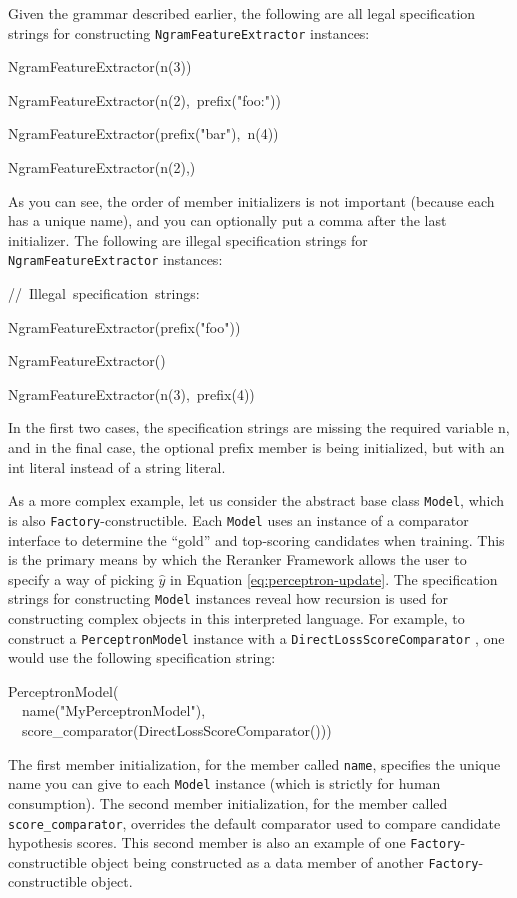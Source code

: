 \documentclass[a4paper]{article}
\let\textquotedbl="
\newenvironment{lyxcode}
{\par\begin{list}{}{
\scriptsize
\setlength{\leftmargin}{0.1in}
\setlength{\rightmargin}{\leftmargin}
\setlength{\listparindent}{0pt}%
\raggedright
\setlength{\itemsep}{0pt}
\setlength{\parsep}{0pt}
\normalfont\ttfamily}%
 \item[]}
{\end{list}}
\begin{document}
Given the grammar described earlier, the following are all legal specification
strings for constructing \texttt{NgramFeatureExtractor} instances:
\begin{lyxcode}
NgramFeatureExtractor(n(3))

NgramFeatureExtractor(n(2),~prefix(\textquotedbl{}foo:\textquotedbl{}))

NgramFeatureExtractor(prefix(\textquotedbl{}bar\textquotedbl{}),~n(4))

NgramFeatureExtractor(n(2),)
\end{lyxcode}
As you can see, the order of member initializers is not important
(because each has a unique name), and you can optionally put a comma
after the last initializer. The following are illegal specification
strings for \texttt{NgramFeatureExtractor} instances:
\begin{lyxcode}
//~Illegal~specification~strings:

NgramFeatureExtractor(prefix(\textquotedbl{}foo\textquotedbl{}))

NgramFeatureExtractor()

NgramFeatureExtractor(n(3),~prefix(4))
\end{lyxcode}
In the first two cases, the specification strings are missing the
required variable n, and in the final case, the optional prefix member
is being initialized, but with an int literal instead of a string
literal.

As a more complex example, let us consider the abstract base class
\texttt{Model}, which is also \texttt{Factory}-constructible. Each
\texttt{Model} uses an instance of a comparator interface to determine
the \textquotedblleft{}gold\textquotedblright{} and top-scoring candidates
when training. This is the primary means by which the Reranker Framework
allows the user to specify a way of picking $\hat{y}$ in Equation
\ref{eq:perceptron-update}. The specification strings for constructing
\texttt{Model} instances reveal how recursion is used for constructing
complex objects in this interpreted language. For example, to construct
a \texttt{PerceptronModel} instance with a \texttt{DirectLossScoreComparator}
, one would use the following specification string:
\begin{lyxcode}
PerceptronModel(\\
~~name(\textquotedbl{}MyPerceptronModel\textquotedbl{}),\\
~~score\_comparator(DirectLossScoreComparator()))
\end{lyxcode}
The first member initialization, for the member called \texttt{name},
specifies the unique name you can give to each \texttt{Model} instance
(which is strictly for human consumption). The second member initialization,
for the member called \texttt{score\_comparator}, overrides the default
comparator used to compare candidate hypothesis scores. This second
member is also an example of one \texttt{Factory}-constructible object
being constructed as a data member of another \texttt{Factory}-constructible
object.
\end{document}

